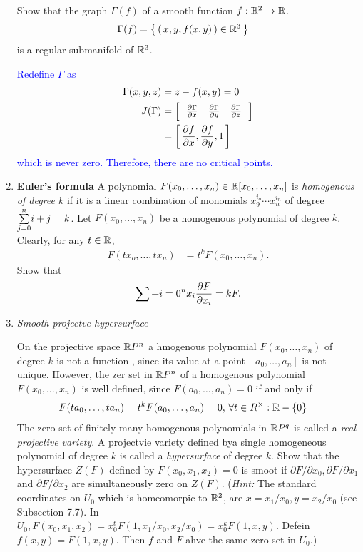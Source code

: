 \documentclass[12pt,a4paper]{report}
\newcommand{\BLUE}[1]{\textcolor{blue}{#1}}
\begin{document}
\begin{enumerate}[label=9.\arabic*.]
Show that the graph $\Gamma(f)$ of a smooth function $f: \mathbb{R}^2\to \mathbb{R}$.
\begin{align*}
	\Gamma(f) &= \left \{\, \left (\, x,y,f(x,y) \,\right ) \in \mathbb{R}^3 \,\right \}
\end{align*}is a regular submanifold of $\mathbb{R}^3$.

\BLUE{Redefine $\Gamma$ as \begin{align*}
	\Gamma(x,y,z) &= z-f(x,y) = 0\\
	J(\Gamma) &= \left [\, \begin{array}{ccc}
		\frac{\partial \Gamma}{\partial x} & \frac{\partial \Gamma}{\partial y} & \frac{\partial \Gamma}{\partial z}
	\end{array}
	 \,\right ] \\
		&= \left [\, \frac{\partial f}{\partial x},\frac{\partial f}{\partial y},1 \,\right ]
\end{align*}which is never zero.  Therefore, there are no critical points.
}

\item \textbf{Euler's formula}
A polynomial $F(x_0,\dots,x_n) \in \mathbb{R}[x_0,\dots,x_n]$ is \textit{homogenous of degree $k$} if it is a linear combination of monomials $x_9^{i_o}\cdots x_n^{i_n}$ of degree $\underset{j=0}{\overset{n}{\sum}}i+j = k$.  Let $F(x_0,\dots,x_n)$ be a homogenous polynomial of degree $k$.  Clearly, for any $t \in \mathbb{R}$,
\begin{align*}
	F(tx_o,\dots,tx_n) &= t^kF(x_0,\dots, x_n).
\end{align*}Show that
\begin{align*}
	\sum+{i=0}^n x_i\frac{\partial F}{\partial x_i} = kF.
\end{align*}

\item \textit{Smooth projectve hypersurface}

On the projective space $\mathbb{R} P^n$ a hmogenous polynomial $F(x_0,\dots,x_n)$ of degree $k$ is not a function , since its value at a point $[a_0,\dots,a_n]$ is not unique.  However, the zer set in $\mathbb{R} P^n$ of a homogenous polynomial $F(x_0,\dots,x_n)$ is well defined, since $F(a_0,\dots,a_n)=0$ if and only if 
\begin{align*}
	F(ta_0,\dots,ta_n) &= t^kF(a_0,\dots,a_n)=0,\, \forall t \in R^\times: \mathbb{R}-\{0\}
\end{align*}The zero set of finitely many homogenous polynomials in $\mathbb{R} P^q$ is called a \textit{real projective variety}.  A projectvie variety defined bya single homogeneous polynomial of degree $k$ is called a \textit{hypersurface} of degree $k$.  Show that the hypersurface $Z(F)$ defined by $F(x_0,x_1,x_2)=0$ is smoot if $\partial F/\partial x_0, \partial F/\partial x_1$ and $\partial F/\partial x_2$ are simultaneously zero on $Z(F)$.  (\textit{Hint:} The standard coordinates on $U_0$ which is homeomorpic to $\mathbb{R}^2$, are $x=x_1/x_0, y=x_2/x_0$ (see Subsection 7.7).  In $U_0, F(x_0,x_1,x_2) = x_0^tF(1,x_1/x_0, x_2/x_0)= x_0^kF(1,x,y)$.  Defein $f(x,y)= F(1,x,y)$.  Then $f$ and $F$ ahve the same zero set in $U_0$.)


\end{enumerate}
\end{document}

